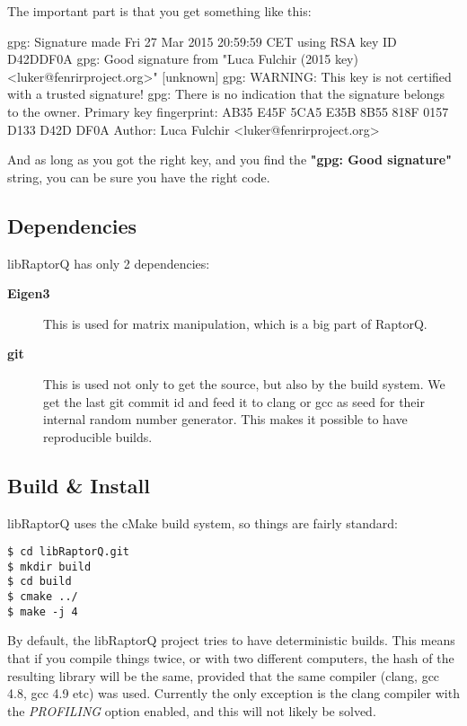 \documentclass[11pt,a4paper]{refart}
\begin{document}
The important part is that you get something like this:

\begin{verbbox}[\footnotesize]
 gpg: Signature made Fri 27 Mar 2015 20:59:59 CET using RSA key ID D42DDF0A
 gpg: Good signature from "Luca Fulchir (2015 key) <luker@fenrirproject.org>"
 [unknown]
 gpg: WARNING: This key is not certified with a trusted signature!
 gpg:          There is no indication that the signature belongs to the owner.
 Primary key fingerprint: AB35 E45F 5CA5 E35B 8B55  818F 0157 D133 D42D DF0A
 Author: Luca Fulchir <luker@fenrirproject.org>
\end{verbbox}
\theverbbox

And as long as you got the right key, and you find the \textbf{"gpg: Good signature"} string,
you can be sure you have the right code.

\subsection{Dependencies}

libRaptorQ has only 2 dependencies:
\begin{description}
\item[\textbf{Eigen3}] This is used for matrix manipulation, which is a big part of RaptorQ.
\item[\textbf{git}] This is used not only to get the source, but also by the build system. We get the last git commit id and feed it to clang or gcc as seed for their
internal random number generator. This makes it possible to have reproducible builds.
\end{description}

\subsection{Build \& Install}

libRaptorQ uses the cMake build system, so things are fairly standard:

\begin{verbatim}
$ cd libRaptorQ.git
$ mkdir build
$ cd build
$ cmake ../
$ make -j 4
\end{verbatim}

By default, the libRaptorQ project tries to have deterministic builds. This means that if you compile things twice, or with two different computers, the
hash of the resulting library will be the same, provided that the same compiler (clang, gcc 4.8, gcc 4.9 etc) was used. Currently the only exception is the clang
compiler with the \textit{PROFILING} option enabled, and this will not likely be solved.
\end{document}
